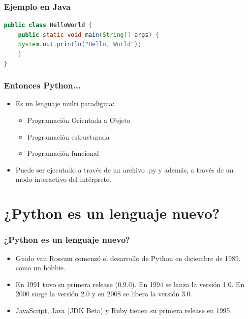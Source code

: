 \documentclass[spanish]{beamer}
\begin{document}
\begin{frame}[fragile]
	\frametitle{Ejemplo en Java}
	\begin{lstlisting}[language=java]
public class HelloWorld {
    public static void main(String[] args) {
    System.out.println("Hello, World");
    }
}
        \end{lstlisting}
\end{frame}

\begin{frame}
	\frametitle{Entonces Python...}
	\begin{itemize}
		\item Es un lenguaje multi paradigma:
			\begin{itemize}
				\item Programación Orientada a Objeto
				\item Programación estructurada
				\item Programación funcional
			\end{itemize}
		\item Puede ser ejecutado a través de un archivo .py y además,
			a través de un modo interactivo del intérprete.
	\end{itemize}
\end{frame}

\section{¿Python es un lenguaje nuevo?}
\begin{frame}
	\frametitle{¿Python es un lenguaje nuevo?}
	\begin{itemize}
		\item Guido van Rossum comenzó el desarrollo de Python en
			diciembre de 1989, como un hobbie.
		\item En 1991 tuvo su primera release (0.9.0). En 1994 se lanza
			la versión 1.0. En 2000 surge la versión 2.0 y en 2008
			se libera la versión 3.0.
		\item JavaScript, Java (JDK Beta) y Ruby tienen su primera release en 1995.
	\end{itemize}
\end{frame}
\end{document}
